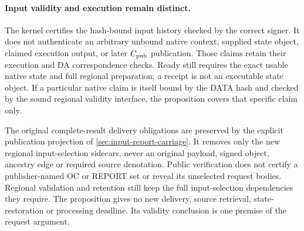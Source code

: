 \paragraph{Input validity and execution remain distinct.}
The kernel certifies the hash-bound input history checked by the
correct signer. It does not authenticate an arbitrary unbound native
context, supplied state object, claimed execution output, or later
$C_{\rm pub}$ publication. Those claims retain their execution and DA
correspondence checks. Ready still requires the exact usable native
state and full regional preparation; a receipt is not an executable
state object. If a particular native claim is itself bound by the DATA
hash and checked by the sound regional validity interface, the
proposition covers that specific claim only.

The original complete-result delivery obligations are preserved by the
explicit publication projection of \cref{sec:input-report-carriage}. It removes
only the new regional input-selection sidecars, never an original payload, signed
object, ancestry edge or required source denotation. Public verification
does not certify a publisher-named OC or REPORT set or reveal its unselected
request bodies. Regional validation and retention still keep the full
input-selection dependencies they require. The proposition gives no new delivery,
source retrieval, state-restoration or processing deadline. Its validity
conclusion is one premise of the request argument.
